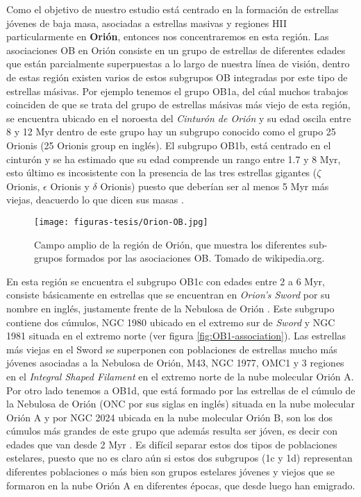  Como el objetivo de nuestro estudio está centrado en la formación de estrellas jóvenes de baja masa, asociadas a estrellas masivas y regiones HII particularmente en \textbf{Orión}, entonces nos concentraremos en esta región. Las asociaciones OB en Orión consiste en un grupo de estrellas de diferentes edades que están parcialmente superpuestas a lo largo de nuestra línea de visión, dentro de estas región existen varios de estos subgrupos OB integradas por este tipo de estrellas másivas. Por ejemplo tenemos el grupo OB1a, del cúal muchos trabajos coinciden de que se trata del grupo de estrellas másivas más viejo de esta región, se encuentra ubicado en el noroesta del \textit{Cinturón de Orión} y su edad oscila entre 8 y 12 Myr \citep{Blaauw:1991, Brown:1994} dentro de este grupo hay un subgrupo conocido como el grupo 25 Orionis (25 Orionis group en inglés). El subgrupo OB1b, está centrado en el cinturón y se ha estimado que su edad comprende un rango entre 1.7 y 8 Myr, esto último es incosistente con la presencia de las tres estrellas gigantes (\(\zeta\) Orionis, \(\epsilon\) Orionis y \(\delta\) Orionis) puesto que deberían ser al menos 5 Myr más viejas, deacuerdo lo que dicen sus masas \citep{Bally:2008a}.\\

\begin{figure}
  \centering
  \texttt{[image: figuras-tesis/Orion-OB.jpg]}
  \caption{Campo amplio de la región de Orión, que muestra los diferentes sub-grupos formados por las asociaciones OB. Tomado de wikipedia.org.}
  \label{fig:orionOB}
\end{figure}
  
En esta región se encuentra el subgrupo OB1c con edades entre 2 a 6 Myr, consiste básicamente  en estrellas que se encuentran en \textit{Orion's Sword} por su nombre en inglés, justamente frente de la Nebulosa de Orión . Este subgrupo contiene dos cúmulos, NGC 1980 ubicado en el extremo sur de \textit{Sword} y NGC 1981 situada en el extremo norte (ver figura \ref{fig:OB1-association}). Las estrellas más viejas en el Sword se superponen con poblaciones de estrellas mucho más jóvenes asociadas a la Nebulosa de Orión, M43, NGC 1977, OMC1 y 3 regiones en el \textit{Integral Shaped Filament} en el extremo norte de la nube molecular Orión A. Por otro lado tenemos a OB1d, que está formado por las estrellas de el cúmulo de la Nebulosa de Orión (ONC por sus siglas en inglés) situada en la nube molecular Orión A y por NGC 2024 ubicada en la nube molecular Orión B, son los dos cúmulos más grandes de este grupo que además resulta ser jóven, es decir con edades que van desde 2 Myr \citep{Muench:2008a}. Es difícil separar estos dos tipos de poblaciones estelares, puesto que no es claro aún si estos dos subgrupos (1c y 1d) representan diferentes poblaciones o más bien son grupos estelares jóvenes y viejos que se formaron en la nube Orión A en diferentes épocas, que desde luego han emigrado.
